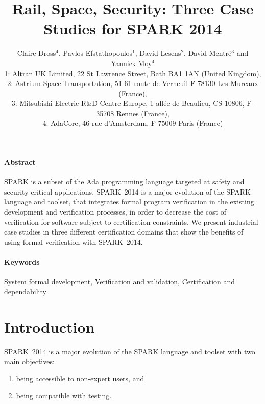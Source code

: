 \documentclass[10pt,a4paper,twocolumn]{article}
\newcommand{\newspark}{SPARK~2014\xspace}
\begin{document}
\title{Rail, Space, Security: Three Case Studies for SPARK 2014}

\author{%
\large Claire Dross$^4$, Pavlos Efstathopoulos$^1$, David Lesens$^2$, David Mentré$^3$ and Yannick Moy$^4$\\
\normalsize 1: Altran UK Limited, 22 St Lawrence Street, Bath BA1 1AN (United Kingdom),\\
\normalsize 2: Astrium Space Transportation, 51-61 route de Verneuil F-78130 Les Mureaux (France),\\
\normalsize 3: Mitsubishi Electric R\&D Centre Europe, 1 allée de
Beaulieu, CS 10806, F-35708 Rennes (France),\\
\normalsize 4: AdaCore, 46 rue d'Amsterdam, F-75009 Paris (France)}

\date{}

\maketitle

\paragraph{Abstract}
SPARK is a subset of the Ada programming language targeted at safety
and security critical applications. \newspark is a major evolution of
the SPARK language and toolset, that integrates formal program
verification in the existing development and verification processes,
in order to decrease the cost of verification for software subject to
certification constraints. We present industrial case studies in three
different certification domains that show the benefits of using formal
verification with \newspark.

\paragraph{Keywords}
System formal development, Verification and validation,
Certification and dependability

\section{Introduction}

\newspark is a major evolution of the SPARK language and toolset with two main
objectives:
%
\begin{enumerate}
\item being accessible to non-expert users, and
\item being compatible with testing.
\end{enumerate}
\end{document}
